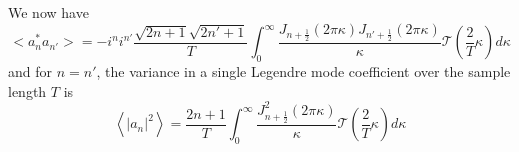 \documentclass[10pt,preprint]{aastex631}
\begin{document}
We now have
\begin{equation}
<a_n^* a_{n'}> = -i^n i^{n'} \frac{\sqrt{2n+1}\sqrt{2n'+1}}{T}   \int_{0}^{\infty} \frac{J_{n+\frac{1}{2}}(2\pi \kappa) J_{n'+\frac{1}{2}}(2\pi \kappa)}{\kappa} \mathcal{T}\left( \frac{2}{T} \kappa \right) d\kappa
\end{equation}
and for $n = n'$, the variance in a single Legendre mode coefficient over the sample length $T$ is
\begin{equation}
\left\langle \left|a_n\right|^2 \right\rangle = \frac{2n+1}{T}  \int_0^{\infty} \frac{ J_{n+\frac{1}{2}}^2(2\pi \kappa)}{\kappa} \mathcal{T}\left( \frac{2}{T} \kappa \right) d\kappa
\label{eqn:varcoeff}
\end{equation}



\end{document}
